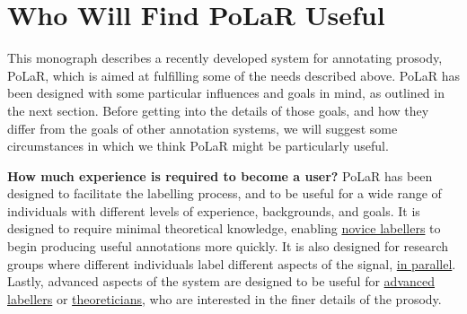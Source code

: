 \documentclass[11pt, twoside]{memoir}
\begin{document}



\section{Who Will Find PoLaR Useful}\label{sec:who-will-find-polar-useful}

This monograph describes a recently developed system for annotating prosody, PoLaR, which is  aimed at fulfilling some of the needs described above. PoLaR has been designed with some particular influences and goals in mind, as outlined in the next section. Before getting into the details of those goals, and how they differ from the goals of other annotation systems, we will suggest some circumstances in which we think PoLaR might be particularly useful.

\textbf{How much experience is required to become a user?} PoLaR has been designed to facilitate the labelling process, and to be useful for a wide range of individuals with different levels of experience, backgrounds, and goals. It is designed to require minimal theoretical knowledge, enabling \uline{novice labellers} to begin producing useful annotations more quickly. It is also designed for research groups where different individuals label different aspects of the signal, \uline{in parallel}. Lastly, advanced aspects of the system are designed to be useful for \uline{advanced labellers} or \uline{theoreticians}, who are interested in the finer details of the prosody.
\end{document}
